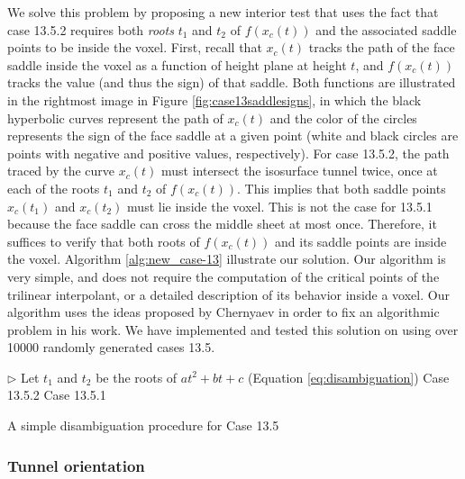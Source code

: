 We solve this problem by proposing a new interior test that uses the fact that case 13.5.2 requires both \emph{roots} $t_1$ and $t_2$ of $f(x_c(t))$ and the associated saddle points to be inside the voxel. 
%
First, recall that $x_c(t)$ tracks the path of the face saddle inside the voxel as a function of height plane at height $t$, and $f(x_c(t))$ tracks the value (and thus the sign) of that saddle. Both functions are illustrated in the rightmost image in Figure \ref{fig:case13saddlesigns}, in which the black hyperbolic curves represent the path of $x_c(t)$ and the color of the circles represents the sign of the face saddle at a given point (white and black circles are points with negative and positive values, respectively).
%
For case 13.5.2, the path traced by the curve $x_c(t)$ must intersect the isosurface tunnel twice, once at each of the roots $t_1$ and $t_2$ of $f(x_c(t))$. 
This implies that both saddle points $x_c(t_1)$ and $x_c(t_2)$ must lie inside the voxel. This is not the case for 13.5.1 because the face saddle can cross the middle sheet at most once. Therefore, it suffices to verify that both roots of $f(x_c(t))$ and its saddle points are inside the voxel. Algorithm \ref{alg:new_case-13} illustrate our solution. Our algorithm is very simple, and does not require the computation of the critical points of the trilinear interpolant, or a detailed description of its behavior inside a voxel. Our algorithm uses the ideas proposed by Chernyaev in order to fix an algorithmic problem in his work.
%
We have implemented and tested this solution on \cmc{} using over 10000 randomly generated cases 13.5.

\begin{algorithm}
\begin{codebox}
\zi $\rhd$ Let $t_1$ and $t_2$ be the roots of $a t^2 + b t + c$ (Equation \eqref{eq:disambiguation})
\li {} 
\li	\Then \Return Case 13.5.2
\li	 \Else \Return  Case 13.5.1
\End
\end{codebox}
\caption{\label{alg:new_case-13}A simple disambiguation procedure for Case 13.5}
\end{algorithm}

\subsubsection{Tunnel orientation}

